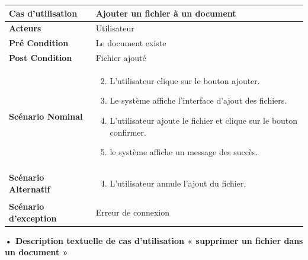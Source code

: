 \begin{longtable}{|p{5cm}|p{10cm}|}
\hline
\textbf{Cas d'utilisation}&Ajouter un fichier à un document\\
\hline
\textbf{Acteurs}&Utilisateur\\
\hline
\textbf{Pré Condition}&Le document existe\\
\hline
\textbf{Post Condition}&Fichier ajouté\\
\hline
\textbf{Scénario Nominal}&
\vspace{-\baselineskip}
\begin{enumerate}
    \setcounter{enumi}{1}
    \item L'utilisateur clique sur le bouton ajouter.
    \item Le système affiche l'interface d'ajout des fichiers.
    \item L'utilisateur ajoute le fichier et clique sur le bouton confirmer.
    \item le système affiche un message des succès.
    
    
\end{enumerate}\\
\hline
\textbf{Scénario Alternatif}&
\vspace{-\baselineskip}
\begin{enumerate}
    \setcounter{enumi}{3}
    \item L'utilisateur annule l'ajout du fichier.
\end{enumerate}\\
\hline
\textbf{Scénario d'exception}&Erreur de connexion\\
\hline
\end{longtable}


\textbf{•	Description textuelle de cas d'utilisation « supprimer un fichier dans un document »}

